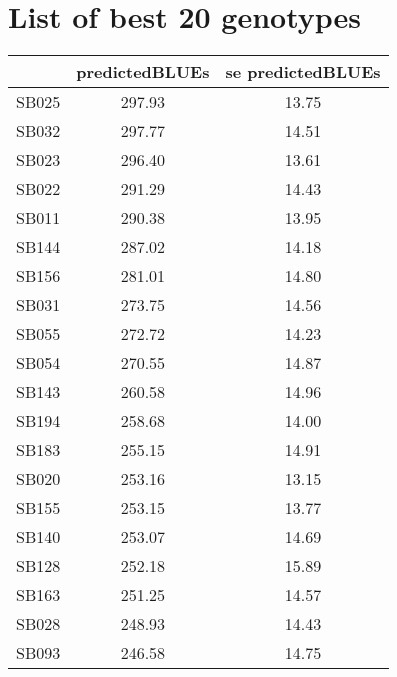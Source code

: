 \documentclass[a4paper,11pt]{article}\usepackage[]{graphicx}\usepackage[]{color}
\begin{document}
\section{List of best 20 genotypes}
\begin{table}[ht]
\begin{flushleft}
\begin{tabular}{lcc}
  \hline
 & predictedBLUEs & se predictedBLUEs \\ 
  \hline
SB025 & 297.93 & 13.75 \\ 
  SB032 & 297.77 & 14.51 \\ 
  SB023 & 296.40 & 13.61 \\ 
  SB022 & 291.29 & 14.43 \\ 
  SB011 & 290.38 & 13.95 \\ 
  SB144 & 287.02 & 14.18 \\ 
  SB156 & 281.01 & 14.80 \\ 
  SB031 & 273.75 & 14.56 \\ 
  SB055 & 272.72 & 14.23 \\ 
  SB054 & 270.55 & 14.87 \\ 
  SB143 & 260.58 & 14.96 \\ 
  SB194 & 258.68 & 14.00 \\ 
  SB183 & 255.15 & 14.91 \\ 
  SB020 & 253.16 & 13.15 \\ 
  SB155 & 253.15 & 13.77 \\ 
  SB140 & 253.07 & 14.69 \\ 
  SB128 & 252.18 & 15.89 \\ 
  SB163 & 251.25 & 14.57 \\ 
  SB028 & 248.93 & 14.43 \\ 
  SB093 & 246.58 & 14.75 \\ 
   \hline
\end{tabular}
\label{bestTab}
\end{flushleft}
\end{table}


\end{document}
